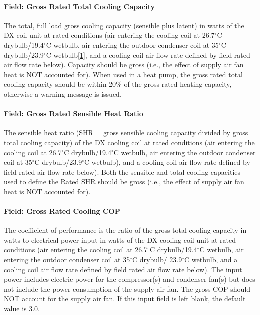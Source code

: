\paragraph{Field: Gross Rated Total Cooling Capacity}\label{field-gross-rated-total-cooling-capacity-1}

The total, full load gross cooling capacity (sensible plus latent) in watts of the DX coil unit at rated conditions (air entering the cooling coil at 26.7$^\circ$C drybulb/19.4$^\circ$C wetbulb, air entering the outdoor condenser coil at 35$^\circ$C drybulb/23.9$^\circ$C wetbulb\protect\hyperlink{ux5fftn1}{{[}1{]}}, and a cooling coil air flow rate defined by field rated air flow rate below). Capacity should be gross (i.e., the effect of supply air fan heat is NOT accounted for). When used in a heat pump, the gross rated total cooling capacity should be within 20\% of the gross rated heating capacity, otherwise a warning message is issued.

\paragraph{Field: Gross Rated Sensible Heat Ratio}\label{field-gross-rated-sensible-heat-ratio}

The sensible heat ratio (SHR = gross sensible cooling capacity divided by gross total cooling capacity) of the DX cooling coil at rated conditions (air entering the cooling coil at 26.7$^\circ$C drybulb/19.4$^\circ$C wetbulb, air entering the outdoor condenser coil at 35$^\circ$C drybulb/23.9$^\circ$C wetbulb), and a cooling coil air flow rate defined by field rated air flow rate below). Both the sensible and total cooling capacities used to define the Rated SHR should be gross (i.e., the effect of supply air fan heat is NOT accounted for).

\paragraph{Field: Gross Rated Cooling COP}\label{field-gross-rated-cooling-cop}

The coefficient of performance is the ratio of the gross total cooling capacity in watts to electrical power input in watts of the DX cooling coil unit at rated conditions (air entering the cooling coil at 26.7$^\circ$C drybulb/19.4$^\circ$C wetbulb, air entering the outdoor condenser coil at 35$^\circ$C drybulb/ 23.9$^\circ$C wetbulb, and a cooling coil air flow rate defined by field rated air flow rate below). The input power includes electric power for the compressor(s) and condenser fan(s) but does not include the power consumption of the supply air fan. The gross COP should NOT account for the supply air fan. If this input field is left blank, the default value is 3.0.

